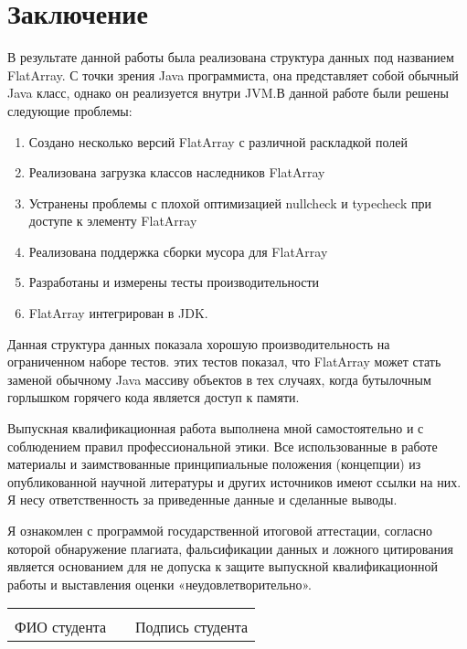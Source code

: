 \section{Заключение}
В результате данной работы была реализована структура данных под названием FlatArray. С точки зрения Java программиста,
она представляет собой обычный Java класс, однако он реализуется внутри JVM.В данной работе были решены следующие проблемы:
\begin{enumerate}
	\item Создано несколько версий FlatArray с различной раскладкой полей
	\item Реализована загрузка классов наследников FlatArray
	\item Устранены проблемы с плохой оптимизацией nullcheck и typecheck при доступе к элементу FlatArray
	\item Реализована поддержка сборки мусора для FlatArray
	\item Разработаны и измерены тесты производительности 
	\item FlatArray интегрирован в JDK.
\end{enumerate}
\par
Данная структура данных показала хорошую производительность на ограниченном наборе тестов. этих тестов показал, что FlatArray может стать заменой обычному Java массиву объектов в тех случаях, когда бутылочным горлышком горячего кода является доступ к памяти.
\par
Выпускная квалификационная работа выполнена мной самостоятельно и с соблюдением правил профессиональной этики. Все использованные в работе материалы и заимствованные принципиальные положения (концепции) из опубликованной научной литературы и других источников имеют ссылки на них. Я несу ответственность за приведенные данные и сделанные выводы.
\par
Я ознакомлен с программой государственной итоговой аттестации, согласно которой обнаружение плагиата, фальсификации данных и ложного цитирования является основанием для не допуска к защите выпускной квалификационной работы и выставления оценки «неудовлетворительно».

\begin{tabular}{lp{2em}l} 
	\hspace{5cm}   && \hspace{4cm} \\ \cline{1-1}\cline{3-3} 
	ФИО студента   && Подпись студента
\end{tabular}

\clearpage
